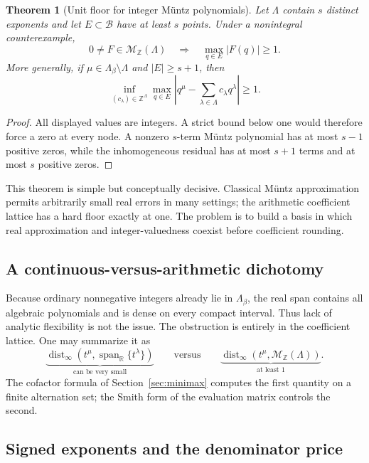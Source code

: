 \documentclass[11pt,oneside]{article}
\newtheorem{theorem}{Theorem}[section]
\theoremstyle{definition}
\theoremstyle{remark}
\newcommand{\Z}{\mathbb Z}
\newcommand{\R}{\mathbb R}
\newcommand{\Bsem}{\mathcal B}
\begin{document}
\begin{theorem}[Unit floor for integer M\"untz polynomials]
\label{thm:muntz-unit-floor}
Let $\Lambda$ contain $s$ distinct exponents and let
$E\subset\Bsem$ have at least $s$ points.  Under a nonintegral counterexample,
\[
 0\ne F\in\mathcal M_\Z(\Lambda)
 \quad\Longrightarrow\quad
 \max_{q\in E}|F(q)|\ge1.
\]
More generally, if $\mu\in\Lambda_\beta\setminus\Lambda$ and $|E|\ge s+1$, then
\begin{equation}
 \inf_{(c_\lambda)\in\Z^\Lambda}
 \max_{q\in E}
 \left|q^\mu-\sum_{\lambda\in\Lambda}c_\lambda q^\lambda\right|
 \ge1.
 \label{eq:muntz-inhom-floor}
\end{equation}
\end{theorem}

\begin{proof}
All displayed values are integers.  A strict bound below one would therefore force a zero at
every node.  A nonzero $s$-term M\"untz polynomial has at most $s-1$ positive zeros, while the
inhomogeneous residual has at most $s+1$ terms and at most $s$ positive zeros.
\end{proof}

This theorem is simple but conceptually decisive.  Classical M\"untz approximation permits
arbitrarily small real errors in many settings; the arithmetic coefficient lattice has a hard
floor exactly at one.  The problem is to build a basis in which real approximation and
integer-valuedness coexist before coefficient rounding.

\subsection{A continuous-versus-arithmetic dichotomy}

Because ordinary nonnegative integers already lie in $\Lambda_\beta$, the real span contains
all algebraic polynomials and is dense on every compact interval.  Thus lack of analytic
flexibility is not the issue.  The obstruction is entirely in the coefficient lattice.
One may summarize it as
\[
 \underbrace{\operatorname{dist}_{\infty}
  (t^\mu,\operatorname{span}_{\R}\{t^\lambda\})}_{\text{can be very small}}
 \qquad\text{versus}\qquad
 \underbrace{\operatorname{dist}_{\infty}
  (t^\mu,\mathcal M_\Z(\Lambda))}_{\text{at least }1}.
\]
The cofactor formula of Section~\ref{sec:minimax} computes the first quantity on a finite
alternation set; the Smith form of the evaluation matrix controls the second.

\subsection{Signed exponents and the denominator price}
\end{document}
